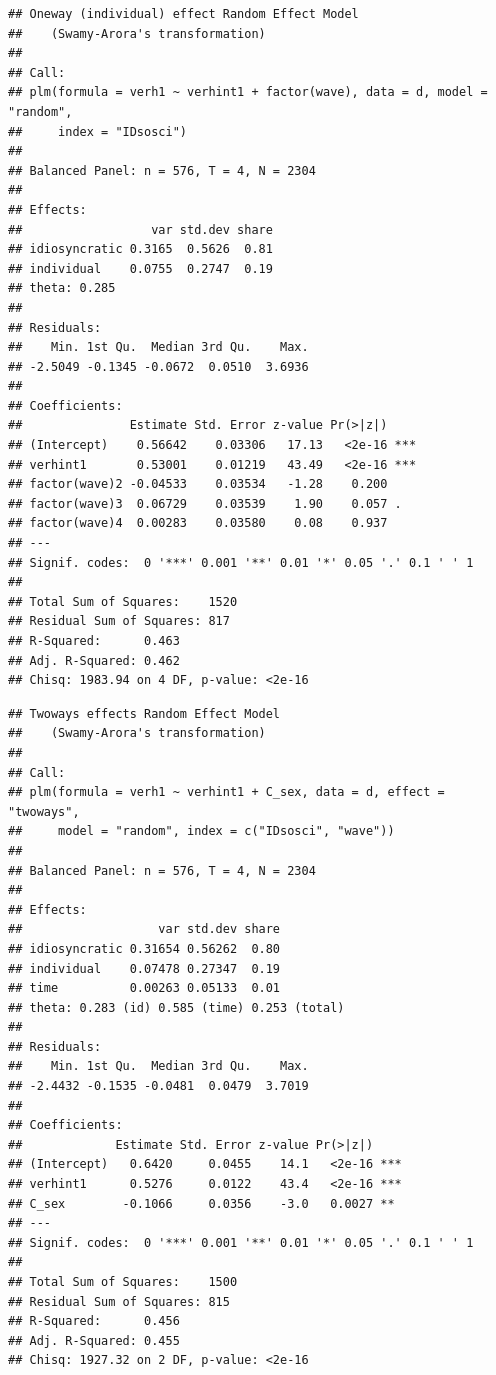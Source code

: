 \documentclass[
]{book}
\newenvironment{Shaded}{\begin{snugshade}}{\end{snugshade}}
\newcommand{\CommentTok}[1]{\textcolor[rgb]{0.56,0.35,0.01}{\textit{#1}}}
\newcommand{\DataTypeTok}[1]{\textcolor[rgb]{0.13,0.29,0.53}{#1}}
\newcommand{\KeywordTok}[1]{\textcolor[rgb]{0.13,0.29,0.53}{\textbf{#1}}}
\newcommand{\NormalTok}[1]{#1}
\newcommand{\OperatorTok}[1]{\textcolor[rgb]{0.81,0.36,0.00}{\textbf{#1}}}
\newcommand{\StringTok}[1]{\textcolor[rgb]{0.31,0.60,0.02}{#1}}
\begin{document}
\begin{verbatim}
## Oneway (individual) effect Random Effect Model 
##    (Swamy-Arora's transformation)
## 
## Call:
## plm(formula = verh1 ~ verhint1 + factor(wave), data = d, model = "random", 
##     index = "IDsosci")
## 
## Balanced Panel: n = 576, T = 4, N = 2304
## 
## Effects:
##                  var std.dev share
## idiosyncratic 0.3165  0.5626  0.81
## individual    0.0755  0.2747  0.19
## theta: 0.285
## 
## Residuals:
##    Min. 1st Qu.  Median 3rd Qu.    Max. 
## -2.5049 -0.1345 -0.0672  0.0510  3.6936 
## 
## Coefficients:
##               Estimate Std. Error z-value Pr(>|z|)    
## (Intercept)    0.56642    0.03306   17.13   <2e-16 ***
## verhint1       0.53001    0.01219   43.49   <2e-16 ***
## factor(wave)2 -0.04533    0.03534   -1.28    0.200    
## factor(wave)3  0.06729    0.03539    1.90    0.057 .  
## factor(wave)4  0.00283    0.03580    0.08    0.937    
## ---
## Signif. codes:  0 '***' 0.001 '**' 0.01 '*' 0.05 '.' 0.1 ' ' 1
## 
## Total Sum of Squares:    1520
## Residual Sum of Squares: 817
## R-Squared:      0.463
## Adj. R-Squared: 0.462
## Chisq: 1983.94 on 4 DF, p-value: <2e-16
\end{verbatim}

\begin{Shaded}
\end{Shaded}

\begin{verbatim}
## Twoways effects Random Effect Model 
##    (Swamy-Arora's transformation)
## 
## Call:
## plm(formula = verh1 ~ verhint1 + C_sex, data = d, effect = "twoways", 
##     model = "random", index = c("IDsosci", "wave"))
## 
## Balanced Panel: n = 576, T = 4, N = 2304
## 
## Effects:
##                   var std.dev share
## idiosyncratic 0.31654 0.56262  0.80
## individual    0.07478 0.27347  0.19
## time          0.00263 0.05133  0.01
## theta: 0.283 (id) 0.585 (time) 0.253 (total)
## 
## Residuals:
##    Min. 1st Qu.  Median 3rd Qu.    Max. 
## -2.4432 -0.1535 -0.0481  0.0479  3.7019 
## 
## Coefficients:
##             Estimate Std. Error z-value Pr(>|z|)    
## (Intercept)   0.6420     0.0455    14.1   <2e-16 ***
## verhint1      0.5276     0.0122    43.4   <2e-16 ***
## C_sex        -0.1066     0.0356    -3.0   0.0027 ** 
## ---
## Signif. codes:  0 '***' 0.001 '**' 0.01 '*' 0.05 '.' 0.1 ' ' 1
## 
## Total Sum of Squares:    1500
## Residual Sum of Squares: 815
## R-Squared:      0.456
## Adj. R-Squared: 0.455
## Chisq: 1927.32 on 2 DF, p-value: <2e-16
\end{verbatim}
\end{document}
